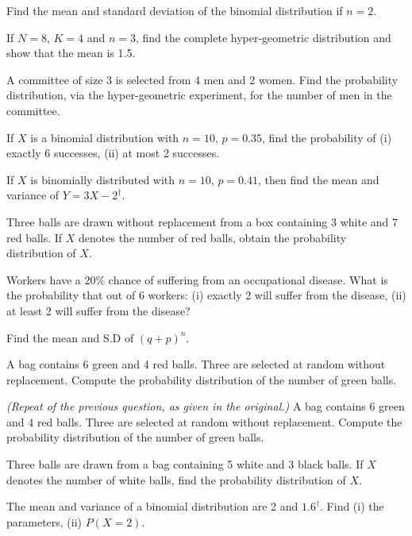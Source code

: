 \documentclass[11pt,a4paper]{article}
\begin{document}
\begin{longlist}
\item Find the mean and standard deviation of the binomial distribution if $n=2$.

\item If $N=8$, $K=4$ and $n=3$, find the complete hyper-geometric distribution and show that the mean is 1.5.

\item A committee of size 3 is selected from 4 men and 2 women. Find the probability distribution, via the hyper-geometric experiment, for the number of men in the committee.

\item If $X$ is a binomial distribution with $n=10$, $p=0.35$, find the probability of (i) exactly 6 successes, (ii) at most 2 successes.

\item If $X$ is binomially distributed with $n=10$, $p=0.41$, then find the mean and variance of $Y=3X-2^\dagger$.

\item Three balls are drawn without replacement from a box containing 3 white and 7 red balls. If $X$ denotes the number of red balls, obtain the probability distribution of $X$.

\item Workers have a 20\% chance of suffering from an occupational disease. What is the probability that out of 6 workers: (i) exactly 2 will suffer from the disease, (ii) at least 2 will suffer from the disease?

\item Find the mean and S.D of $(q+p)^n$.

\item A bag contains 6 green and 4 red balls. Three are selected at random without replacement. Compute the probability distribution of the number of green balls.

\item \emph{(Repeat of the previous question, as given in the original.)} A bag contains 6 green and 4 red balls. Three are selected at random without replacement. Compute the probability distribution of the number of green balls.

\item Three balls are drawn from a bag containing 5 white and 3 black balls. If $X$ denotes the number of white balls, find the probability distribution of $X$.

\item The mean and variance of a binomial distribution are 2 and $1.6^\dagger$. Find (i) the parameters, (ii) $P(X=2)$.


\end{longlist}
\end{document}
